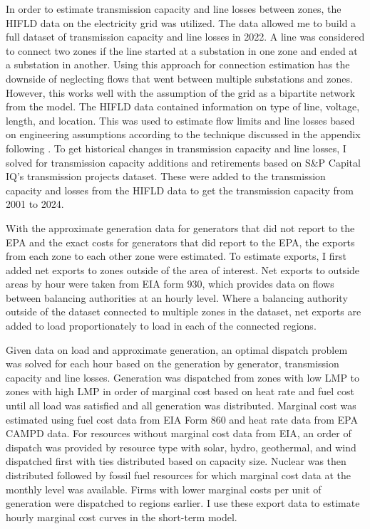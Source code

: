 \documentclass[12pt]{article}
\begin{document}
In order to estimate transmission capacity and line losses between zones, the HIFLD data on the electricity grid was utilized. The data allowed me to build a full dataset of transmission capacity and line losses in 2022. A line was considered to connect two zones if the line started at a substation in one zone and ended at a substation in another. Using this approach for connection estimation has the downside of neglecting flows that went between multiple substations and zones. However, this works well with the assumption of the grid as a bipartite network from the model. The HIFLD data contained information on type of line, voltage, length, and location. This was used to estimate flow limits and line losses based on engineering assumptions according to the technique discussed in the appendix following \cite{arkolakis2023clean}. To get historical changes in transmission capacity and line losses, I solved for transmission capacity additions and retirements based on S\&P Capital IQ's transmission projects dataset. These were added to the transmission capacity and losses from the HIFLD data to get the transmission capacity from 2001 to 2024.

With the approximate generation data for generators that did not report to the EPA and the exact costs for generators that did report to the EPA, the exports from each zone to each other zone were estimated. To estimate exports, I first added net exports to zones outside of the area of interest. Net exports to outside areas by hour were taken from EIA form 930, which provides data on flows between balancing authorities at an hourly level. Where a balancing authority outside of the dataset connected to multiple zones in the dataset, net exports are added to load proportionately to load in each of the connected regions. 

Given data on load and approximate generation, an optimal dispatch problem was solved for each hour based on the generation by generator, transmission capacity and line losses. Generation was dispatched from zones with low LMP to zones with high LMP in order of marginal cost based on heat rate and fuel cost until all load was satisfied and all generation was distributed. Marginal cost was estimated using fuel cost data from EIA Form 860 and heat rate data from EPA CAMPD data. For resources without marginal cost data from EIA, an order of dispatch was provided by resource type with solar, hydro, geothermal, and wind dispatched first with ties distributed based on capacity size. Nuclear was then distributed followed by fossil fuel resources for which marginal cost data at the monthly level was available. Firms with lower marginal costs per unit of generation were dispatched to regions earlier. I use these export data to estimate hourly marginal cost curves in the short-term model.
\end{document}
